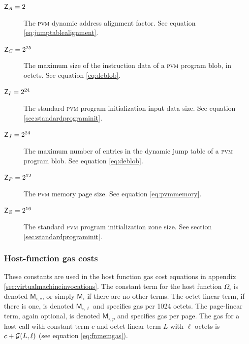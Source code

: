 \begin{description}
  \item[$\mathsf{Z}_A = 2$] The \textsc{pvm} dynamic address alignment factor. See equation \ref{eq:jumptablealignment}.
  \item[$\mathsf{Z}_C = 2^{25}$] The maximum size of the instruction data of a \textsc{pvm} program blob, in octets. See equation \ref{eq:deblob}.
  \item[$\mathsf{Z}_I = 2^{24}$] The standard \textsc{pvm} program initialization input data size. See equation \ref{sec:standardprograminit}.
  \item[$\mathsf{Z}_J = 2^{24}$] The maximum number of entries in the dynamic jump table of a \textsc{pvm} program blob. See equation \ref{eq:deblob}.
  \item[$\mathsf{Z}_P = 2^{12}$] The \textsc{pvm} memory page size. See equation \ref{eq:pvmmemory}.
  \item[$\mathsf{Z}_Z = 2^{16}$] The standard \textsc{pvm} program initialization zone size. See section \ref{sec:standardprograminit}.
\end{description}

\subsubsection{Host-function gas costs}

These constants are used in the host function gas cost equations in appendix \ref{sec:virtualmachineinvocations}. The constant term for the host function $\Omega_\square$ is denoted $\mathsf{M}_{\square,c}$, or simply $\mathsf{M}_\square$ if there are no other terms. The octet-linear term, if there is one, is denoted $\mathsf{M}_{\square,\ell}$ and specifies gas per 1024 octets. The page-linear term, again optional, is denoted $\mathsf{M}_{\square,p}$ and specifies gas per page. The gas for a host call with constant term $c$ and octet-linear term $L$ with $\ell$ octets is $c + \mathcal{G}(L, \ell)$ (see equation \ref{eq:fnmemgas}).

